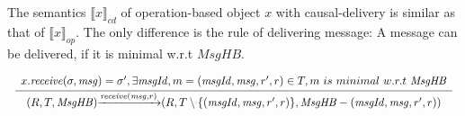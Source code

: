The semantics $\llbracket x \rrbracket_{\mathit{cd}}$ of operation-based object $x$ with causal-delivery is similar as that of $\llbracket x \rrbracket_{\mathit{op}}$. The only difference is the rule of delivering message: A message can be delivered, if it is minimal w.r.t $\mathit{MsgHB}$.

$\begin{array}{l c}
   \bigfrac{
   \begin{array}{c}
      x.\mathit{receive}(\sigma,\mathit{msg}) = \sigma',\exists \mathit{msgId}, m = (\mathit{msgId},\mathit{msg},r',r) \in T, m \ is \ minimal \ w.r.t \ \mathit{MsgHB} 
   \end{array}}
     {(R,T,\mathit{MsgHB}) {\xrightarrow{\mathit{receive}(\mathit{msg},r)}} (R,T \setminus \{ (\mathit{msgId},\mathit{msg},r',r) \},\mathit{MsgHB} - (\mathit{msgId},\mathit{msg},r',r) )}
\end{array}$

